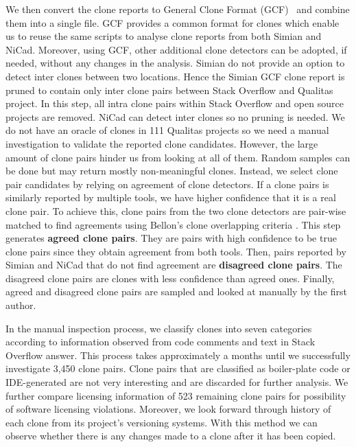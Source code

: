 \documentclass{sig-alternate-05-2015}
\begin{document}
We then convert the clone reports to General Clone Format (GCF)~\cite{Wang2013} and combine them into a single file. GCF provides a common format for clones which enable us to reuse the same scripts to analyse clone reports from both Simian and NiCad. Moreover, using GCF, other additional clone detectors can be adopted, if needed, without any changes in the analysis. Simian do not provide an option to detect inter clones between two locations. Hence the Simian GCF clone report is pruned to contain only inter clone pairs between Stack Overflow and Qualitas project. In this step, all intra clone pairs within Stack Overflow and open source projects are removed. NiCad can detect inter clones so no pruning is needed. We do not have an oracle of clones in 111 Qualitas projects so we need a manual investigation to validate the reported clone candidates. However, the large amount of clone pairs hinder us from looking at all of them. Random samples can be done but may return mostly non-meaningful clones. Instead, we select clone pair candidates by relying on agreement of clone detectors. If a clone pairs is similarly reported by multiple tools, we have higher confidence that it is a real clone pair. To achieve this, clone pairs from the two clone detectors are pair-wise matched to find agreements using Bellon's clone overlapping criteria \cite{Bellon2007}. This step generates \textbf{agreed clone pairs}. They are pairs with high confidence to be true clone pairs since they obtain agreement from both tools. Then, pairs reported by Simian and NiCad that do not find agreement are \textbf{disagreed clone pairs}. The disagreed clone pairs are clones with less confidence than agreed ones. Finally, agreed and disagreed clone pairs are sampled and looked at manually by the first author.

In the manual inspection process, we classify clones into seven categories according to information observed from code comments and text in Stack Overflow answer. This process takes approximately a months until we successfully investigate 3,450 clone pairs. Clone pairs that are classified as boiler-plate code or IDE-generated are not very interesting and are discarded for further analysis. We further compare licensing information of 523 remaining clone pairs for possibility of software licensing violations. Moreover, we look forward through history of each clone from its project's versioning systems. With this method we can observe whether there is any changes made to a clone after it has been copied. %
\end{document}
